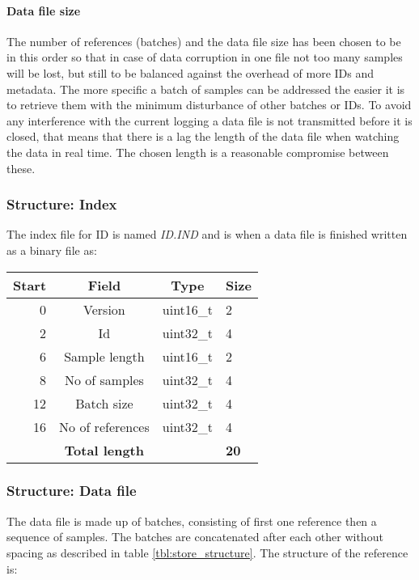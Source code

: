 \documentclass[a4paper]{article}
\begin{document}
\begin{multicols}{2}
  \paragraph{Data file size}
  The number of references (batches) and the data file size has been
  chosen to be in this order so that in case of data corruption in one
  file not too many samples will be lost, but still to be balanced
  against the overhead of more IDs and metadata. The more specific a
  batch of samples can be addressed the easier it is to retrieve them
  with the minimum disturbance of other batches or IDs. To avoid any
  interference with the current logging a data file is not transmitted
  before it is closed, that means that there is a lag the length of the
  data file when watching the data in real time. The chosen length is a
  reasonable compromise between these.


  \subsubsection{Structure: Index}
  The index file for ID is named \textit{ID.IND} and is when a data file
  is finished written as a binary file as:
  \vspace{1em}

  \begin{tabular}{|r|c|c|l|}
    \hline
    \bfseries Start    &     \bfseries Field     & \bfseries  Type
    &   \bfseries Size  \\ \hline
    0   & Version   & uint16\_t   & 2 \\ \hline
    2   & Id        & uint32\_t   & 4 \\ \hline
    6   & Sample length & uint16\_t & 2 \\ \hline
    8   & No of samples   & uint32\_t   & 4 \\ \hline
    12  & Batch size & uint32\_t  & 4 \\ \hline
    16  & No of references & uint32\_t & 4 \\ \hline
    & \textbf{Total length} &  & \textbf{20} \\ \hline
  \end{tabular}
  \label{tab:index_binary_fields}

  \subsubsection{Structure: Data file}
  The data file is made up of batches, consisting of first one reference
  then a sequence of samples. The batches are concatenated after each
  other without spacing as described in table \ref{tbl:store_structure}.
  The structure of the reference is:
  \vspace{1em}


\end{multicols}
\end{document}

